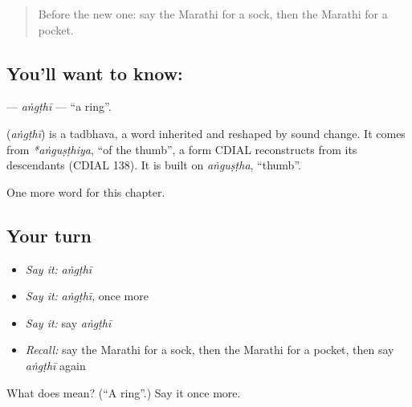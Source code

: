 \label{lesson:MR-C116-angthi}



\begin{quote}
Before the new one: say the Marathi for a sock, then the Marathi for a pocket.
\end{quote}

\subsection*{You'll want to know: }
\textbf{} — \emph{aṅgṭhī} — \textquotedblleft{}a ring\textquotedblright{}.

\begin{cousinweb}
\textbf{} (\emph{aṅgṭhī}) is a tadbhava, a word inherited and reshaped by sound change. It comes from \emph{*aṅguṣṭhiya}, \textquotedblleft{}of the thumb\textquotedblright{}, a form CDIAL reconstructs from its descendants (CDIAL 138). It is built on \emph{aṅguṣṭha}, \textquotedblleft{}thumb\textquotedblright{}.
\end{cousinweb}

\begin{grammarlens}[title={What you've built}]
One more word for this chapter.
\end{grammarlens}

\subsection*{Your turn}
\begin{itemize}
\raggedright
  \item \emph{Say it:} \emph{aṅgṭhī}
  \item \emph{Say it:} \emph{aṅgṭhī}, once more
  \item \emph{Say it:} say \emph{aṅgṭhī}
  \item \emph{Recall:} say the Marathi for a sock, then the Marathi for a pocket, then say \emph{aṅgṭhī} again
\end{itemize}

\begin{tcolorbox}[breakable,colback=teal!4,colframe=teal!35!black,title={Before you move on}]
What does  mean? (\textquotedblleft{}A ring\textquotedblright{}.) Say it once more.
\end{tcolorbox}
